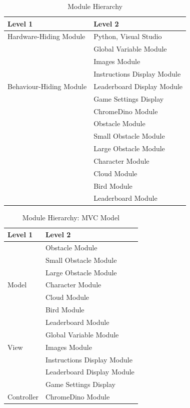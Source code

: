 \documentclass[12pt, titlepage]{article}
\begin{document}
\begin{table}[h!]
\centering
\begin{tabular}{p{} p{}}
\toprule
\textbf{Level 1} & \textbf{Level 2}\\
\midrule

{Hardware-Hiding Module} & Python, Visual Studio\\
\midrule

\multirow{7}{0.3\textwidth}{Behaviour-Hiding Module} 
& Global Variable Module \\
& Images Module \\
& Instructions Display Module \\
& Leaderboard Display Module \\
& Game Settings Display\\ 
\midrule

\multirow{3}{0.3\textwidth}{Software Decision Module} & ChromeDino Module\\
& Obstacle Module \\
& Small Obstacle Module \\
& Large Obstacle Module \\
& Character Module \\
& Cloud Module \\
& Bird Module \\
& Leaderboard Module \\
\bottomrule

\end{tabular}
\caption{Module Hierarchy}
\label{TblMH}
\end{table}

\begin{table}[h!]
\centering
\begin{tabular}{p{} p{}}
\toprule
\textbf{Level 1} & \textbf{Level 2}\\
\midrule


\multirow{7}{0.3\textwidth}{Model} 
& Obstacle Module \\
& Small Obstacle Module \\
& Large Obstacle Module \\
& Character Module \\
& Cloud Module \\
& Bird Module \\
& Leaderboard Module \\
\midrule

\multirow{3}{0.3\textwidth}{View} 
& Global Variable Module \\
& Images Module \\
& Instructions Display Module \\
& Leaderboard Display Module \\
& Game Settings Display\\ 
\bottomrule

\multirow{1.2}{0.3\textwidth}{Controller} 
& ChromeDino Module \\
\midrule

\end{tabular}
\caption{Module Hierarchy: MVC Model}
\label{TblMH}
\end{table}
\end{document}
